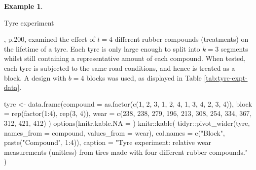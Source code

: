 \documentclass[
]{book}
\newenvironment{Shaded}{\begin{snugshade}}{\end{snugshade}}
\newcommand{\AttributeTok}[1]{\textcolor[rgb]{0.77,0.63,0.00}{#1}}
\newcommand{\DecValTok}[1]{\textcolor[rgb]{0.00,0.00,0.81}{#1}}
\newcommand{\FunctionTok}[1]{\textcolor[rgb]{0.00,0.00,0.00}{#1}}
\newcommand{\NormalTok}[1]{#1}
\newcommand{\OtherTok}[1]{\textcolor[rgb]{0.56,0.35,0.01}{#1}}
\newcommand{\SpecialCharTok}[1]{\textcolor[rgb]{0.00,0.00,0.00}{#1}}
\newcommand{\StringTok}[1]{\textcolor[rgb]{0.31,0.60,0.02}{#1}}
\theoremstyle{definition}
\theoremstyle{definition}
\newtheorem{example}{Example}[chapter]
\theoremstyle{definition}
\theoremstyle{definition}
\theoremstyle{remark}
\begin{document}
\begin{example}
\protect\hypertarget{exm:blocks-tyres}{}\label{exm:blocks-tyres}

Tyre experiment \citep[ch.~3]{WH2009}

\citet{Davies1954}, p.200, examined the effect of \(t=4\) different rubber compounds (treatments) on the lifetime of a tyre. Each tyre is only large enough to split into \(k=3\) segments whilst still containing a representative amount of each compound. When tested, each tyre is subjected to the same road conditions, and hence is treated as a block. A design with \(b=4\) blocks was used, as displayed in Table \ref{tab:tyre-expt-data}.

\begin{Shaded}
\begin{Highlighting}[]
\NormalTok{tyre }\OtherTok{\textless{}{-}} \FunctionTok{data.frame}\NormalTok{(}\AttributeTok{compound =} \FunctionTok{as.factor}\NormalTok{(}\FunctionTok{c}\NormalTok{(}\DecValTok{1}\NormalTok{, }\DecValTok{2}\NormalTok{, }\DecValTok{3}\NormalTok{, }\DecValTok{1}\NormalTok{, }\DecValTok{2}\NormalTok{, }\DecValTok{4}\NormalTok{, }\DecValTok{1}\NormalTok{, }\DecValTok{3}\NormalTok{, }\DecValTok{4}\NormalTok{, }\DecValTok{2}\NormalTok{, }\DecValTok{3}\NormalTok{, }\DecValTok{4}\NormalTok{)),}
                   \AttributeTok{block =} \FunctionTok{rep}\NormalTok{(}\FunctionTok{factor}\NormalTok{(}\DecValTok{1}\SpecialCharTok{:}\DecValTok{4}\NormalTok{), }\FunctionTok{rep}\NormalTok{(}\DecValTok{3}\NormalTok{, }\DecValTok{4}\NormalTok{)), }
                   \AttributeTok{wear =} \FunctionTok{c}\NormalTok{(}\DecValTok{238}\NormalTok{, }\DecValTok{238}\NormalTok{, }\DecValTok{279}\NormalTok{, }\DecValTok{196}\NormalTok{, }\DecValTok{213}\NormalTok{, }\DecValTok{308}\NormalTok{, }\DecValTok{254}\NormalTok{, }\DecValTok{334}\NormalTok{, }\DecValTok{367}\NormalTok{, }\DecValTok{312}\NormalTok{, }\DecValTok{421}\NormalTok{, }\DecValTok{412}\NormalTok{)}
\NormalTok{                     )}
\FunctionTok{options}\NormalTok{(}\AttributeTok{knitr.kable.NA =} \StringTok{\textquotesingle{}\textquotesingle{}}\NormalTok{)}
\NormalTok{knitr}\SpecialCharTok{::}\FunctionTok{kable}\NormalTok{(}
\NormalTok{ tidyr}\SpecialCharTok{::}\FunctionTok{pivot\_wider}\NormalTok{(tyre, }\AttributeTok{names\_from =}\NormalTok{ compound, }\AttributeTok{values\_from =}\NormalTok{ wear),}
 \AttributeTok{col.names =} \FunctionTok{c}\NormalTok{(}\StringTok{"Block"}\NormalTok{, }\FunctionTok{paste}\NormalTok{(}\StringTok{"Compound"}\NormalTok{, }\DecValTok{1}\SpecialCharTok{:}\DecValTok{4}\NormalTok{)),}
 \AttributeTok{caption =} \StringTok{"Tyre experiment: relative wear measurements (unitless) from tires made with four different rubber compounds."}
\NormalTok{)}
\end{Highlighting}
\end{Shaded}


\end{example}
\end{document}
